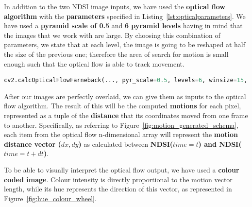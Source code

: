 \documentclass[12pt, a4paper]{report}
\begin{document}
	\par In addition to the two NDSI image inputs, we have used the \textbf{optical flow algorithm} with the \textbf{parameters} specified in Listing~\ref{lst:opticalparameters}. We have used a \textbf{pyramid scale of 0.5} and \textbf{6 pyramid levels} having in mind that the images that we work with are large. By choosing this combination of parameters, we state that at each level, the image is going to be reshaped at half the size of the previous one; therefore the area of search for motion is small enough such that the optical flow is able to track movement.  

	\begin{lstlisting}[caption={Optical flow parameters},label={lst:opticalparameters},language=Python]
		cv2.calcOpticalFlowFarneback(..., pyr_scale=0.5, levels=6, winsize=15, iterations=3, poly_n=5, poly_sigma=1.2, flags=0)
	\end{lstlisting}

	\par After our images are perfectly overlaid, we can give them as inputs to the optical flow algorithm. The result of this will be the computed \textbf{motions} for each pixel, represented as a tuple of the \textbf{distance} that its coordinates moved from one frame to another. Specifically, as referring to Figure~\ref{fig:motion_generated_schema}, each item from the optical flow n-dimensional array will represent the \textbf{motion distance vector (\(dx, dy\))} as calculated between \textbf{NDSI(\(time=t\)) and NDSI(\(time=t + dt\))}.
	
	\par To be able to visually interpret the optical flow output, we have used a \textbf{colour coded image}. Colour intensity is directly proportional to the motion vector length, while its hue represents the direction of this vector, as represented in Figure~\ref{fig:hue_colour_wheel}.
	
\end{document}
